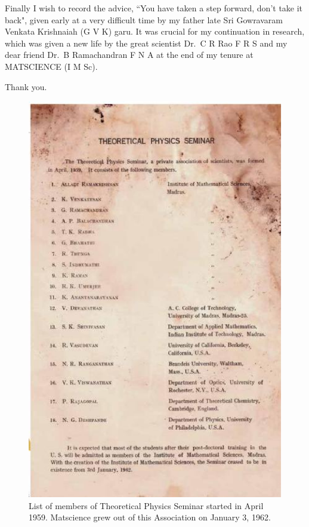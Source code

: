 Finally I wish to record the advice, ``You have taken a step forward, don’t take it
back", given early at a very difficult time by my father late Sri Gowravaram Venkata
Krishnaiah (G V K) garu. It was crucial for my continuation in research, which was given a new life by the
great scientist Dr.\ C R Rao F R S and my dear friend Dr.\ B Ramachandran F N A at
the end of my tenure at MATSCIENCE (I M Sc).
\bigskip

\hfill
Thank you.
\newpage


\begin{figure}[H]
\centering
\includegraphics[scale=0.65]{src/images/chap25/1.eps}
\caption{List of members of Theoretical Physics Seminar started in April 1959. Matscience grew out of
this Association on January 3, 1962.}
\end{figure}

